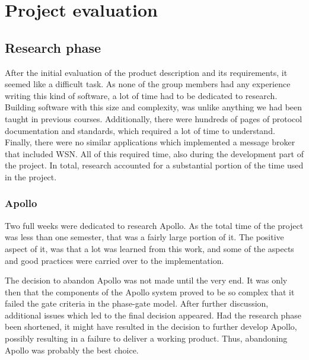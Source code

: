 
\chapter{Project evaluation}
\label{ch:project_evaluation}

\section{Research phase}
\label{sec:project_evaluation-research_phase}


After the initial evaluation of the product description and its requirements, it seemed like a difficult task. As none of the group members had any experience writing this kind of software, a lot of time had to be dedicated to research. Building software with this size and complexity, was unlike anything we had been taught in previous courses. Additionally, there were hundreds of pages of protocol documentation and standards, which required a lot of time to understand. Finally, there were no similar applications which implemented a message broker that included WSN. All of this required time, also during the development part of the project. In total, research accounted for a substantial portion of the time used in the project.

\subsection{Apollo}
\label{subsec:project_evaluation-research_phase-apollo}

Two full weeks were dedicated to research Apollo. As the total time of the project was less than one semester, that was a fairly large portion of it. The positive aspect of it, was that a lot was learned from this work, and some of the aspects and good practices were carried over to the implementation.

The decision to abandon Apollo was not made until the very end. It was only then that the components of the Apollo system proved to be so complex that it failed the gate criteria in the phase-gate model. After further discussion, additional issues which led to the final decision appeared. Had the research phase been shortened, it might have resulted in the decision to further develop Apollo, possibly resulting in a failure to deliver a working product. Thus, abandoning Apollo was probably the best choice.

